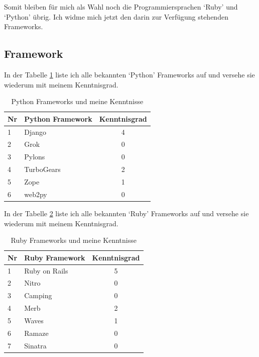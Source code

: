 Somit bleiben für mich als Wahl noch die Programmiersprachen `Ruby' und `Python'
übrig. Ich widme mich jetzt den darin zur Verfügung stehenden Frameworks.

\subsection{Framework}
In der Tabelle \ref{tab:python_frameworks} liste ich alle bekannten `Python' 
Frameworks \cite{python_frameworks} auf und versehe sie wiederum mit meinem Kenntnisgrad.

\begin{table}[h]
\begin{center}
    \begin{tabular}{llc}
        \toprule Nr & Python Framework & Kenntnisgrad \\
        \midrule 1 & Django & 4 \\
        \midrule 2 & Grok & 0 \\
        \midrule 3 & Pylons & 0 \\
        \midrule 4 & TurboGears & 2 \\
        \midrule 5 & Zope & 1 \\
        \midrule 6 & web2py & 0 \\
        \bottomrule
    \end{tabular}
    \caption{Python Frameworks und meine Kenntnisse}
    \label{tab:python_frameworks}
\end{center}
\end{table}

In der Tabelle \ref{tab:ruby_frameworks} liste ich alle bekannten `Ruby' 
Frameworks \cite{ruby_frameworks} auf und versehe sie wiederum mit meinem Kenntnisgrad.

\begin{table}[ht]
\begin{center}
    \begin{tabular}{llc}
        \toprule Nr & Ruby Framework & Kenntnisgrad \\
        \midrule 1 & Ruby on Rails & 5 \\
        \midrule 2 & Nitro & 0 \\
        \midrule 3 & Camping & 0 \\
        \midrule 4 & Merb & 2 \\
        \midrule 5 & Waves & 1 \\
        \midrule 6 & Ramaze & 0 \\
        \midrule 7 & Sinatra & 0 \\
        \bottomrule
    \end{tabular}
    \caption{Ruby Frameworks und meine Kenntnisse}
    \label{tab:ruby_frameworks}
\end{center}
\end{table}

